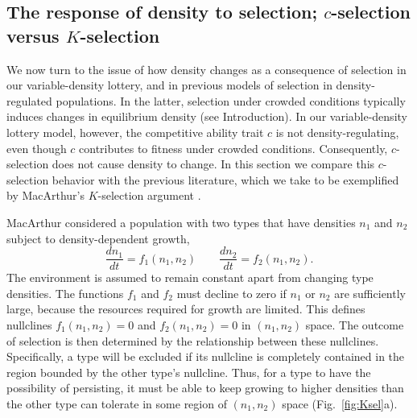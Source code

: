 \documentclass[12pt]{article}
\begin{document}
\subsection*{The response of density to selection; $c$-selection versus $K$-selection}

We now turn to the issue of how density changes as a consequence of selection in our variable-density lottery, and in previous models of selection in density-regulated populations. In the latter, selection under crowded conditions typically induces changes in equilibrium density (see Introduction). In our variable-density lottery model, however, the competitive ability trait $c$ is not density-regulating, even though $c$ contributes to fitness under crowded conditions. Consequently, $c$-selection does not cause density to change. In this section we compare this $c$-selection behavior with the previous literature, which we take to be exemplified by MacArthur's $K$-selection argument \citep{macarthur_1967}.

MacArthur considered a population with two types that have densities $n_1$ and $n_2$ subject to density-dependent growth,
\begin{equation}
\frac{d n_1}{d t}=f_1(n_1,n_2)\qquad\frac{d n_2}{d t}=f_2(n_1,n_2). \label{eq:macgeneral}
\end{equation}
The environment is assumed to remain constant apart from changing type densities. The functions $f_1$ and $f_2$ must decline to zero if $n_1$ or $n_2$ are sufficiently large, because the resources required for growth are limited. This defines nullclines $f_1(n_1,n_2)=0$ and $f_2(n_1,n_2)=0$ in $(n_1,n_2)$ space. The outcome of selection is then determined by the relationship between these nullclines. Specifically, a type will be excluded if its nullcline is completely contained in the region bounded by the other type's nullcline. Thus, for a type to have the possibility of persisting, it must be able to keep growing to higher densities than the other type can tolerate in some region of $(n_1,n_2)$ space (Fig.~\ref{fig:Ksel}a).
\end{document}
